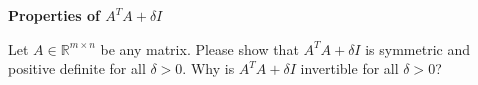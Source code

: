 \textbf{\normalsize Properties of $A^TA + \delta I$}

Let $A \in  \mathbb{R}^{m \times n}$ be any matrix. Please show that
$A^TA + \delta I$ is  symmetric and positive definite for all $\delta >0$. Why is $A^TA + \delta I$ invertible for all $\delta >0$?